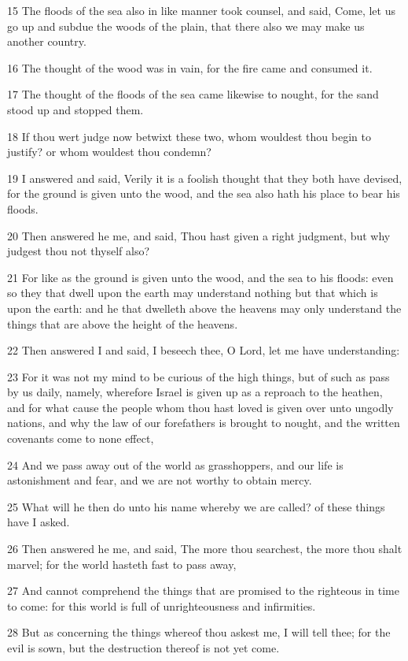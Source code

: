 \par 15 The floods of the sea also in like manner took counsel, and said, Come, let us go up and subdue the woods of the plain, that there also we may make us another country.
\par 16 The thought of the wood was in vain, for the fire came and consumed it.
\par 17 The thought of the floods of the sea came likewise to nought, for the sand stood up and stopped them.
\par 18 If thou wert judge now betwixt these two, whom wouldest thou begin to justify? or whom wouldest thou condemn?
\par 19 I answered and said, Verily it is a foolish thought that they both have devised, for the ground is given unto the wood, and the sea also hath his place to bear his floods.
\par 20 Then answered he me, and said, Thou hast given a right judgment, but why judgest thou not thyself also?
\par 21 For like as the ground is given unto the wood, and the sea to his floods: even so they that dwell upon the earth may understand nothing but that which is upon the earth: and he that dwelleth above the heavens may only understand the things that are above the height of the heavens.
\par 22 Then answered I and said, I beseech thee, O Lord, let me have understanding:
\par 23 For it was not my mind to be curious of the high things, but of such as pass by us daily, namely, wherefore Israel is given up as a reproach to the heathen, and for what cause the people whom thou hast loved is given over unto ungodly nations, and why the law of our forefathers is brought to nought, and the written covenants come to none effect,
\par 24 And we pass away out of the world as grasshoppers, and our life is astonishment and fear, and we are not worthy to obtain mercy.
\par 25 What will he then do unto his name whereby we are called? of these things have I asked.
\par 26 Then answered he me, and said, The more thou searchest, the more thou shalt marvel; for the world hasteth fast to pass away,
\par 27 And cannot comprehend the things that are promised to the righteous in time to come: for this world is full of unrighteousness and infirmities.
\par 28 But as concerning the things whereof thou askest me, I will tell thee; for the evil is sown, but the destruction thereof is not yet come.
